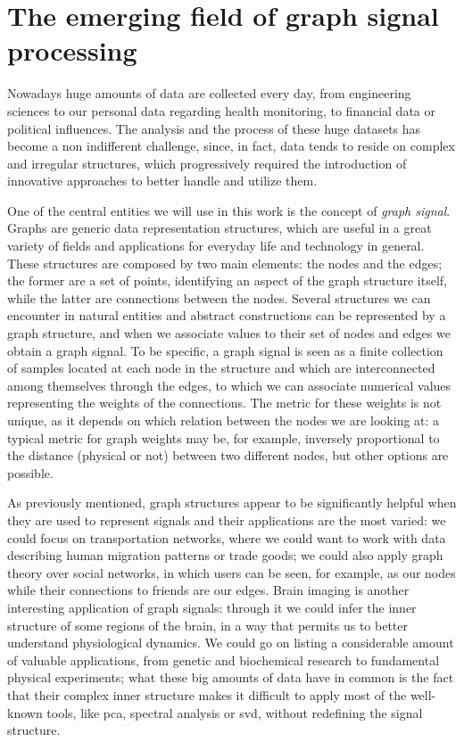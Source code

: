 \chapter{The emerging field of graph signal processing}
Nowadays huge amounts of data are collected every day, from engineering sciences to our personal data regarding health monitoring, to financial data or political influences. The analysis and the process of these huge datasets has become a non indifferent challenge, since, in fact, data tends to reside on complex and irregular structures, which progressively required the introduction of innovative approaches to better handle and utilize them. \cite{Ortega2017} \cite{Sandry}

One of the central entities we will use in this work is the concept of \textit{graph signal}. Graphs are generic data representation structures, which are useful in a great variety of fields and applications for everyday life and technology in general. These structures are composed by two main elements: the nodes and the edges; the former are a set of points, identifying an aspect of the graph structure itself, while the latter are connections between the nodes. Several structures we can encounter in natural entities and abstract constructions can be represented by a graph structure, and when we associate values to their set of nodes and edges we obtain a graph signal. To be specific, a graph signal is seen as a finite collection of samples located at each node in the structure and which are interconnected among themselves through the edges, to which we can associate numerical values representing the weights of the connections. The metric for these weights is not unique, as it depends on which relation between the nodes we are looking at: a typical metric for graph weights may be, for example, inversely proportional to the distance (physical or not) between two different nodes, but other options are possible.

As previously mentioned, graph structures appear to be significantly helpful when they are used to represent signals and their applications are the most varied: we could focus on transportation networks, where we could want to work with data describing human migration patterns or trade goods; we could also apply graph theory over social networks, in which users can be seen, for example, as our nodes while their connections to friends are our edges. \cite{Ortega2017} Brain imaging is another interesting application of graph signals: through it we could infer the inner structure of some regions of the brain, in a way that permits us to better understand physiological dynamics.  \cite{Shuman2013} We could go on listing a considerable amount of valuable applications, from genetic and biochemical research to fundamental physical experiments; what these big amounts of data have in common is the fact that their complex inner structure makes it difficult to apply most of the well-known tools, like \gls{pca}, spectral analysis or \gls{svd}, without redefining the signal structure. \cite{Sandry}

